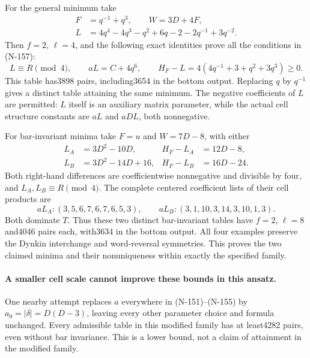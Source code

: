 For the general minimum take
\[
\begin{aligned}
 F&=q^{-1}+q^3,\qquad W=3D+4F,\\
 L&=4q^4-4q^3-q^2+6q-2-2q^{-1}+3q^{-2}.
\end{aligned}\tag{N-163}
\]
Then $f=2$, $\ell=4$, and the following exact identities prove
all the conditions in (N-157):
\[
 L\equiv R\pmod4,\qquad aL=C+4q^6,\qquad
 H_F-L=4(4q^{-1}+3+q^2+3q^3)\ge0.
\]
This table has3898 pairs, including3654 in the bottom output.
Replacing $q$ by $q^{-1}$ gives a distinct table attaining the
same minimum.  The negative coefficients of $L$ are permitted:
$L$ itself is an auxiliary matrix parameter, while the actual
cell structure constants are $aL$ and $aDL$, both nonnegative.

For bar-invariant minima take $F=u$ and $W=7D-8$, with either
\[
 \begin{aligned}
 L_A&=3D^2-10D,& H_F-L_A&=12D-8,\\
 L_B&=3D^2-14D+16,& H_F-L_B&=16D-24.
 \end{aligned}\tag{N-164}
\]
Both right-hand differences are coefficientwise nonnegative and
divisible by four, and $L_A,L_B\equiv R\pmod4$.
The complete centered coefficient lists of their cell products are
\[
 aL_A:(3,5,6,7,6,7,6,5,3),\qquad
 aL_B:(3,1,10,3,14,3,10,1,3).
\]
Both dominate $T$.  Thus these two distinct bar-invariant tables
have $f=2$, $\ell=8$ and4046 pairs each, with3634 in the bottom
output.  All four examples preserve the Dynkin interchange and
word-reversal symmetries.  This proves the two claimed minima and
their nonuniqueness within exactly the specified family.

\paragraph{A smaller cell scale cannot improve these bounds in this ansatz.}
One nearby attempt replaces $a$ everywhere in (N-151)--(N-155) by
$a_0=|\delta|=D(D-3)$, leaving every other parameter choice and
formula unchanged.  Every admissible table in this modified family
has at least4282 pairs, even without bar invariance.  This is a
lower bound, not a claim of attainment in the modified family.

